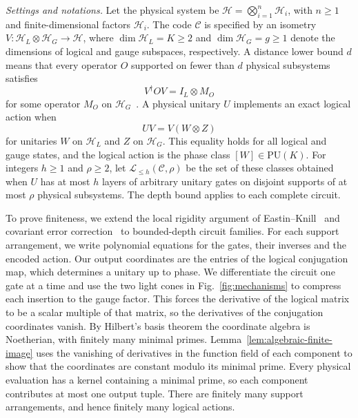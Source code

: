 \documentclass[aps,prl,reprint,notitlepage,nofootinbib,nobibnotes]{revtex4-2}
\newcommand{\HH}{\mathcal H}
\newcommand{\PU}{\mathrm{PU}}
\newcommand{\id}{I}
\begin{document}
 \textit{Settings and notations.} Let the physical system be \(\HH=\bigotimes_{i=1}^{n}\HH_i\), with
\(n\ge1\) and finite-dimensional factors $\HH_i$. The code \(\mathcal C\) is specified
by an isometry \(V:\HH_L\otimes\HH_G\longrightarrow\HH\), where
\(\dim\HH_L=K\ge2\) and \(\dim\HH_G=g\ge1\) denote the dimensions of logical and
gauge subspaces, respectively.
A distance lower bound \(d\) means that every operator \(O\) supported on
fewer than \(d\) physical subsystems satisfies
\begin{equation}\label{eq:correctable}
  V^\dagger O V=\id_L\otimes M_O
\end{equation}
for some operator \(M_O\) on \(\HH_G\)~\cite{KL,Kribs}.
A physical unitary \(U\) implements an exact logical action when
\begin{equation}\label{eq:encoded}
  UV=V(W\otimes Z)
\end{equation}
for unitaries \(W\) on \(\HH_L\) and \(Z\) on \(\HH_G\).
This equality holds for all logical and gauge states, and the logical
action is the phase class \([W]\in\PU(K)\).
For integers \(h\ge1\) and \(\rho\ge2\), let
\(\mathcal L_{\le h}(\mathcal C,\rho)\) be the set of these classes obtained
when \(U\) has at most \(h\) layers of arbitrary unitary gates on disjoint
supports of at most \(\rho\) physical subsystems.
The depth bound applies to each complete circuit.

To prove finiteness, we extend the local rigidity argument of
Eastin--Knill~\cite{EK} and covariant error correction~\cite{Faist,LiuZhou}
to bounded-depth circuit families. For each support arrangement, we
write polynomial equations for the gates, their inverses and the
encoded action. Our output coordinates are the entries of the logical
conjugation map, which determines a unitary up to phase. We differentiate
the circuit one gate at a time and use the two light cones in
Fig.~\ref{fig:mechanisms} to compress each insertion to the gauge factor.
This forces the derivative of the logical matrix to be a scalar
multiple of that matrix, so the derivatives of the conjugation
coordinates vanish. By Hilbert's basis
theorem the coordinate algebra is Noetherian, with finitely many
minimal primes. Lemma~\ref{lem:algebraic-finite-image} uses the vanishing
of derivatives in the function field of each component to show that
the coordinates are constant modulo its minimal prime. Every physical
evaluation has a kernel containing a minimal prime, so each component
contributes at most one output tuple. There are finitely many support
arrangements, and hence finitely many logical actions.
\end{document}
